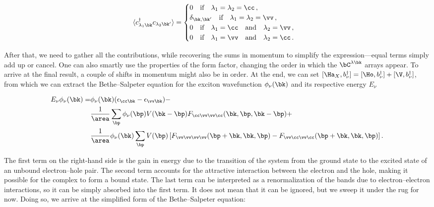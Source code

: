 \begin{equation}
    \langle c^{\dagger}_{\lambda_1 \bk} c_{\lambda_2 \bk'}  \rangle =
    \begin{cases}
        0 \quad \text{if} \quad \lambda_1 = \lambda_2 = \cc \,, \\
        \delta_{\bk,\bk'} \quad \text{if} \quad \lambda_1 = \lambda_2 = \vv\,, \\
        0 \quad \text{if} \quad \lambda_1 = \cc  \quad \text{and} \quad \lambda_2 = \vv\,, \\
        0 \quad \text{if} \quad \lambda_1 = \vv \quad \text{and} \quad \lambda_2 = \cc \,.
    \end{cases}
\end{equation}

\noindent After that, we need to gather all the contributions, while recovering the sums in momentum to simplify the expression---equal terms simply add up or cancel.
One can also smartly use the properties of the form factor, changing the order in which the $\bC^{\lambda \bk}$ arrays appear.
To arrive at the final result, a couple of shifts in momentum might also be in order.
At the end, we can set $[\Ha_X, b^{\dagger}_{\nu}] = [\Ho, b^{\dagger}_{\nu}] + [\V, b^{\dagger}_{\nu}]$, from which we can extract the Bethe--Salpeter equation for the exciton wavefunction $\phi_\nu(\bk)$ and its respective energy $E_\nu$

\begin{equation}
    \label{eq:BSE_full}
    \begin{split}
        E_\nu \phi_\nu(\bk)  =&   \phi_{\nu}(\bk) (\epsilon_{\cc  \bk} - \epsilon_{\vv \bk}) - \\
        & \frac{1}{\area} \sum_{\bp} \phi_{\nu} (\bp) V(\bk-\bp) F_{\cc  \vv \vv \cc }(\bk,\bp,\bk-\bp) +  \\
        & \frac{1}{\area} \phi_{\nu}(\bk) \sum_{\bp} V(\bp) \left[F_{\vv \vv \vv \vv }(\bp + \bk ,\bk,\bp) - F_{\vv \cc \vv \cc }(\bp + \bk,\bk,\bp) \right].
    \end{split}
\end{equation}

The first term on the right-hand side is the gain in energy due to the transition of the system from the ground state to the excited state of an unbound electron--hole pair.
The second term accounts for the attractive interaction between the electron and the hole, making it possible for the complex to form a bound state.
The last term can be interpreted as a renormalization of the bands due to electron--electron interactions, so it can be simply absorbed into the first term.
It does not mean that it can be ignored, but we sweep it under the rug for now.
Doing so, we arrive at the simplified form of the Bethe--Salpeter equation:

